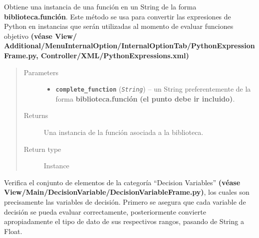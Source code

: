 \documentclass[class=report, crop=false]{standalone}
\begin{document}
\begin{fulllineitems}
\begin{fulllineitems}
\end{fulllineitems}

\begin{fulllineitems}

Obtiene una instancia de una función en un String 
de la forma \textbf{biblioteca.función}.
Este método se usa para convertir las expresiones de Python
en instancias que serán utilizadas al momento de evaluar  
funciones objetivo \textbf{(véase View/}\break
\textbf{Additional/MenuInternalOption/InternalOptionTab/}\break\textbf{PythonExpressionFrame.py, Controller/XML/PythonExpressions.xml)}

\begin{quote}\begin{description}
\item[{Parameters}] \leavevmode\begin{itemize}
\item \textbf{\texttt{complete\_function}} (\emph{\texttt{String}}) -- un String preferentemente de la forma \textbf{biblioteca.función} \textbf{(el punto debe ir incluido)}.
\end{itemize}
\item[{Returns}] \leavevmode
Una instancia de la función asociada a la biblioteca.
\item[{Return type}] \leavevmode
Instance
\end{description}\end{quote}

\end{fulllineitems}

\begin{fulllineitems}

Verifica el conjunto de elementos de la categoría ``Decision Variables''
\textbf{(véase View/Main/DecisionVariable/DecisionVariableFrame.py)}, 
los cuales son precisamente las variables de decisión.\break
Primero se asegura que cada variable de decisión se pueda evaluar
correctamente, posteriormente convierte apropiadamente el tipo
de dato de sus respectivos rangos, pasando de String a Float.


\end{fulllineitems}
\end{fulllineitems}
\end{document}
